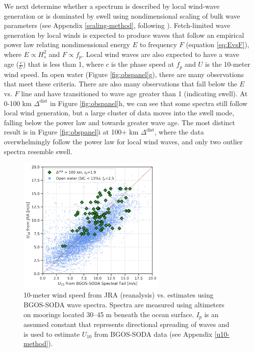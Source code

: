 \documentclass [11pt, proquest] {uwthesis}[2020/02/24]
\begin{document}
We next determine whether a spectrum is described by local wind-wave generation or is dominated by swell using nondimensional scaling of bulk wave parameters (see Appendix \ref{scaling-method}, following \cite{Young1999}). Fetch-limited wave generation by local winds is expected to produce waves that follow an empirical power law relating nondimensional energy $E$ to frequency $F$ (equation \ref{eq:EvsF}), where $E \propto H_s^2$ and $F \propto f_p$. Local wind waves are also expected to have a wave age ($\frac{c}{U}$) that is less than 1, where $c$ is the phase speed at $f_p$ and $U$ is the 10-meter wind speed. In open water (Figure \ref{fig:obspanel}g), there are many observations that meet these criteria. There are also many observations that fall below the $E$ vs. $F$ line and have transitioned to wave age greater than 1 (indicating swell). At 0-100 km $\Delta^{ \mathrm{dist}}$ in Figure \ref{fig:obspanel}h, we can see that some spectra still follow local wind generation, but a large cluster of data moves into the swell mode, falling below the power law and towards greater wave age. The most distinct result is in Figure \ref{fig:obspanel}i at 100+ km $\Delta^{ \mathrm{dist}}$, where the data overwhelmingly follow the power law for local wind waves, and only two outlier spectra resemble swell.  

\begin{figure}
    \noindent\includegraphics[width=0.65\textwidth]{u10_02.png}
    \caption{10-meter wind speed from JRA (reanalysis) vs. estimates using BGOS-SODA wave spectra. Spectra are measured using altimeters on moorings located 30--45 m beneath the ocean surface. $I_p$ is an assumed constant that represents directional spreading of waves and is used to estimate $U_{10}$ from BGOS-SODA data (see Appendix \ref{u10-method}).}
    \label{fig:u10}
\end{figure}
\end{document}
